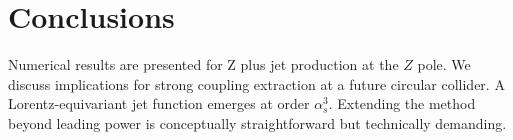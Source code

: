 \section{Conclusions}\label{sec:conclusions}

Numerical results are presented for Z plus jet production at the $Z$
pole. We discuss implications for strong coupling extraction at a future
circular collider. A Lorentz-equivariant jet function emerges at order
$\alpha_s^3$. Extending the method beyond leading power is conceptually
straightforward but technically demanding.

